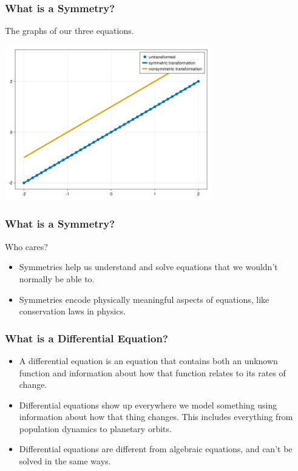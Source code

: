 \documentclass{beamer}
\begin{document}
\begin{frame}
    \frametitle{What is a Symmetry?}
    The graphs of our three equations.\\
    \begin{center}
        \includegraphics[width=9cm]{y=x+1.png}
    \end{center}
\end{frame}



\begin{frame}
    \frametitle{What is a Symmetry?}
    \begin{Large}
        Who cares?
    \end{Large}
    \vspace*{0.25in}
    \begin{itemize}
        \item Symmetries help us understand and solve equations that we wouldn't normally be able to.\pause
        \item Symmetries encode physically meaningful aspects of equations, like conservation laws in physics.
    \end{itemize}
\end{frame}



\begin{frame}
    \frametitle{What is a Differential Equation?}
    \begin{definition}
    \begin{itemize}
        \item A differential equation is an equation that contains both an unknown function and information about how that function relates to its rates of change. \pause
        \item Differential equations show up everywhere we model something using information about how that thing changes. This includes everything from population dynamics to planetary orbits. \pause
        \item Differential equations are different from algebraic equations, and can't be solved in the same ways.
    \end{itemize}
\end{definition}
\end{frame}
\end{document}
